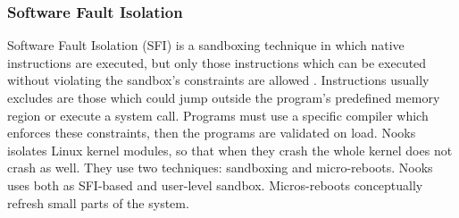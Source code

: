 \subsubsection{Software Fault Isolation}

Software Fault Isolation (SFI) is a sandboxing technique in which native instructions are executed, but only those instructions 
which can be executed without violating the sandbox's constraints are allowed \cite{SFI:93}. Instructions usually excludes 
are those which could jump outside the program's predefined memory region or execute a system call. 
Programs must use a specific compiler which enforces these constraints, then the programs are validated on load. 
Nooks \cite{Nooks:03} isolates Linux kernel modules, so that when they crash the whole kernel does not crash as well. 
They use two techniques: sandboxing and micro-reboots. Nooks uses both as SFI-based and user-level sandbox. 
Micros-reboots conceptually refresh small parts of the system.